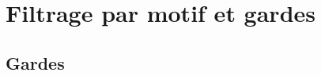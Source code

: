 \section{Filtrage par motif et gardes}
\label{pattern-matching-and-guards}
\label{pattern-matching}

\subsection{Gardes}

\label{guards}
